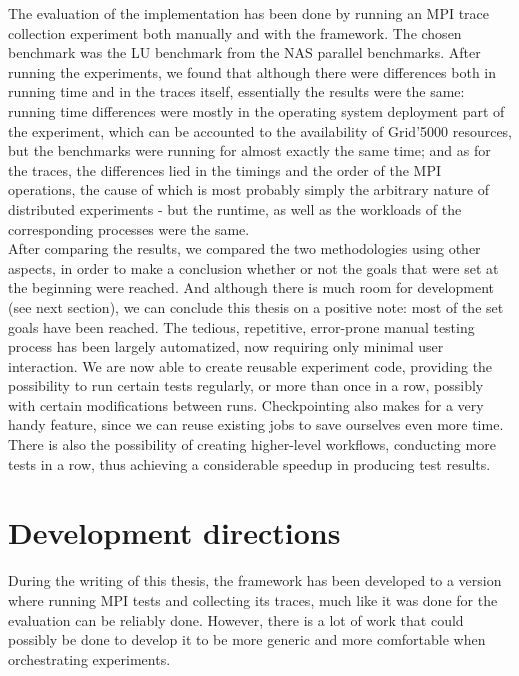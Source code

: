 The evaluation of the implementation has been done by running an MPI
trace collection experiment both manually and with the framework. The
chosen benchmark was the LU benchmark from the NAS parallel
benchmarks. After running the experiments, we found that although
there were differences both in running time and in the traces itself,
essentially the results were the same: running time differences were
mostly in the operating system deployment part of the experiment,
which can be accounted to the availability of Grid'5000 resources, but
the benchmarks were running for almost exactly the same time; and as
for the traces, the differences lied in the timings and the order of
the MPI operations, the cause of which is most probably simply the
arbitrary nature of distributed experiments - but the runtime, as well
as the workloads of the corresponding processes were the
same.\\[0.3cm]
After comparing the results, we compared the two methodologies using
other aspects, in order to make a conclusion whether or not the goals
that were set at the beginning were reached. And although there is
much room for development (see next section), we can conclude this
thesis on a positive note: most of the set goals have been
reached. The tedious, repetitive, error-prone manual testing process
has been largely automatized, now requiring only minimal user
interaction. We are now able to create reusable experiment code,
providing the possibility to run certain tests regularly, or more than
once in a row, possibly with certain modifications between
runs. Checkpointing also makes for a very handy
feature, since we can reuse existing jobs to save ourselves even more
time. There is also the possibility of creating higher-level
workflows, conducting more tests in a row, thus achieving a
considerable speedup in producing test results.
\section{Development directions}
During the writing of this thesis, the framework has been developed to
a version where running MPI tests and collecting its traces, much like
it was done for the evaluation can be reliably done. However, there
is a lot of work that could possibly be done to develop it to be
more generic and more comfortable when orchestrating experiments.
